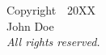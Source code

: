 \thispagestyle{empty}
{
  \parindent 0pt
  \begin{center}
      Copyright~\textregistered~20XX \\
      John Doe \\
      {\it All rights reserved.}
  \end{center}
}

